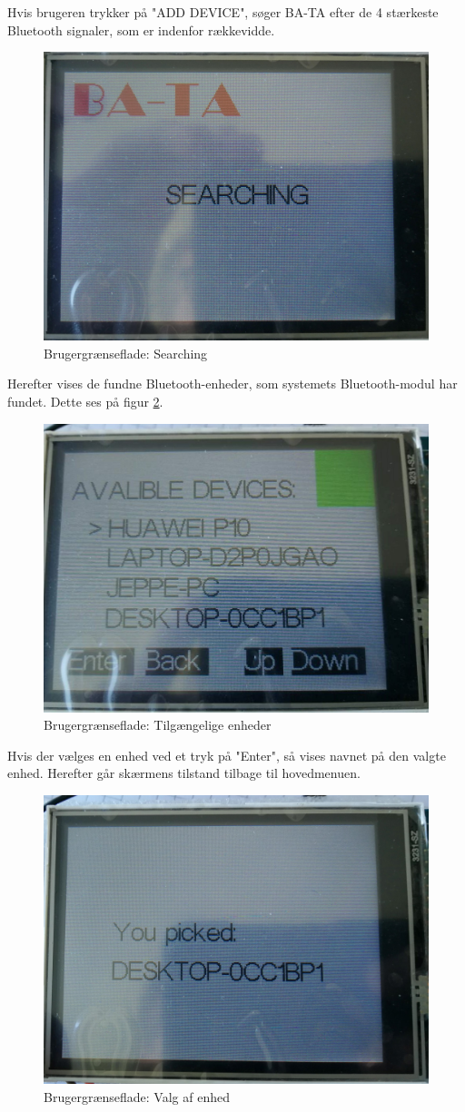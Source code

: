 Hvis brugeren trykker på "ADD DEVICE", søger BA-TA efter de 4 stærkeste Bluetooth signaler, som er indenfor rækkevidde. 
\begin{figure}[H]
	\centering
	\includegraphics[width = 300 pt]{Img/Searching.jpg}
	\caption{Brugergrænseflade: Searching}
	\label{fig:Searching}
\end{figure}
Herefter vises de fundne Bluetooth-enheder, som systemets Bluetooth-modul har fundet. Dette ses på figur \ref{fig:devices}.
\begin{figure}[H]
	\centering
	\includegraphics[width = 300 pt]{Img/devices.jpg}
	\caption{Brugergrænseflade: Tilgængelige enheder}
	\label{fig:devices}
\end{figure}
Hvis der vælges en enhed ved et tryk på "Enter", så vises navnet på den valgte enhed. Herefter går skærmens tilstand tilbage til hovedmenuen. 
\begin{figure}[H]
	\centering
	\includegraphics[width = 300 pt]{Img/pick.jpg}
	\caption{Brugergrænseflade: Valg af enhed}
	\label{fig:pick}
\end{figure}

